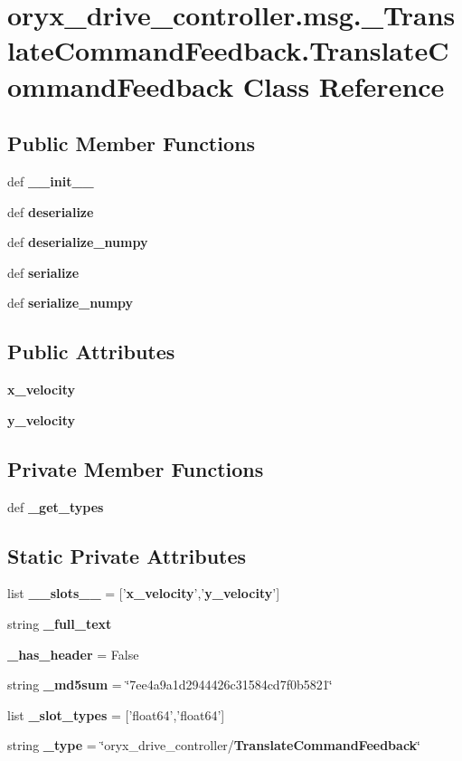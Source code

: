 \section{oryx\-\_\-drive\-\_\-controller.\-msg.\-\_\-\-Translate\-Command\-Feedback.\-Translate\-Command\-Feedback \-Class \-Reference}
\label{classoryx__drive__controller_1_1msg_1_1__TranslateCommandFeedback_1_1TranslateCommandFeedback}
\subsection*{\-Public \-Member \-Functions}
\begin{DoxyCompactItemize}
\item 
def {\bf \-\_\-\-\_\-init\-\_\-\-\_\-}
\item 
def {\bf deserialize}
\item 
def {\bf deserialize\-\_\-numpy}
\item 
def {\bf serialize}
\item 
def {\bf serialize\-\_\-numpy}
\end{DoxyCompactItemize}
\subsection*{\-Public \-Attributes}
\begin{DoxyCompactItemize}
\item 
{\bf x\-\_\-velocity}
\item 
{\bf y\-\_\-velocity}
\end{DoxyCompactItemize}
\subsection*{\-Private \-Member \-Functions}
\begin{DoxyCompactItemize}
\item 
def {\bf \-\_\-get\-\_\-types}
\end{DoxyCompactItemize}
\subsection*{\-Static \-Private \-Attributes}
\begin{DoxyCompactItemize}
\item 
list {\bf \-\_\-\-\_\-slots\-\_\-\-\_\-} = ['{\bf x\-\_\-velocity}','{\bf y\-\_\-velocity}']
\item 
string {\bf \-\_\-full\-\_\-text}
\item 
{\bf \-\_\-has\-\_\-header} = \-False
\item 
string {\bf \-\_\-md5sum} = \char`\"{}7ee4a9a1d2944426c31584cd7f0b5821\char`\"{}
\item 
list {\bf \-\_\-slot\-\_\-types} = ['float64','float64']
\item 
string {\bf \-\_\-type} = \char`\"{}oryx\-\_\-drive\-\_\-controller/{\bf \-Translate\-Command\-Feedback}\char`\"{}
\end{DoxyCompactItemize}



